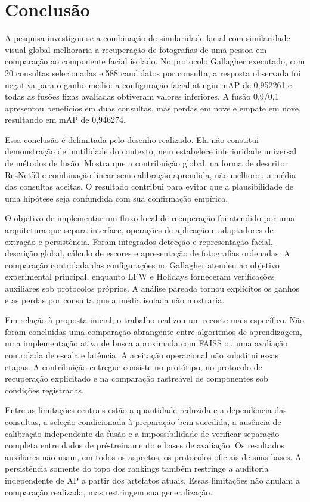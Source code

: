 \chapter{Conclusão}
\label{cap:conclusao}
A pesquisa investigou se a combinação de similaridade facial com similaridade visual global melhoraria a recuperação de fotografias de uma pessoa em comparação ao componente facial isolado. No protocolo Gallagher executado, com 20 consultas selecionadas e 588 candidatos por consulta, a resposta observada foi negativa para o ganho médio: a configuração facial atingiu mAP de 0,952261 e todas as fusões fixas avaliadas obtiveram valores inferiores. A fusão 0,9/0,1 apresentou benefícios em duas consultas, mas perdas em nove e empate em nove, resultando em mAP de 0,946274.

Essa conclusão é delimitada pelo desenho realizado. Ela não constitui demonstração de inutilidade do contexto, nem estabelece inferioridade universal de métodos de fusão. Mostra que a contribuição global, na forma de descritor ResNet50 e combinação linear sem calibração aprendida, não melhorou a média das consultas aceitas. O resultado contribui para evitar que a plausibilidade de uma hipótese seja confundida com sua confirmação empírica.

O objetivo de implementar um fluxo local de recuperação foi atendido por uma arquitetura que separa interface, operações de aplicação e adaptadores de extração e persistência. Foram integrados detecção e representação facial, descrição global, cálculo de escores e apresentação de fotografias ordenadas. A comparação controlada das configurações no Gallagher atendeu ao objetivo experimental principal, enquanto LFW e Holidays forneceram verificações auxiliares sob protocolos próprios. A análise pareada tornou explícitos os ganhos e as perdas por consulta que a média isolada não mostraria.

Em relação à proposta inicial, o trabalho realizou um recorte mais específico. Não foram concluídas uma comparação abrangente entre algoritmos de aprendizagem, uma implementação ativa de busca aproximada com FAISS ou uma avaliação controlada de escala e latência. A aceitação operacional não substitui essas etapas. A contribuição entregue consiste no protótipo, no protocolo de recuperação explicitado e na comparação rastreável de componentes sob condições registradas.

Entre as limitações centrais estão a quantidade reduzida e a dependência das consultas, a seleção condicionada à preparação bem-sucedida, a ausência de calibração independente da fusão e a impossibilidade de verificar separação completa entre dados de pré-treinamento e bases de avaliação. Os resultados auxiliares não usam, em todos os aspectos, os protocolos oficiais de suas bases. A persistência somente do topo dos rankings também restringe a auditoria independente de AP a partir dos artefatos atuais. Essas limitações não anulam a comparação realizada, mas restringem sua generalização.

